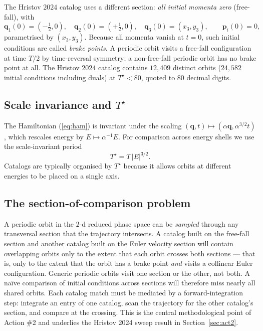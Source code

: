 \documentclass[11pt]{article}
\newcommand{\qvec}{\mathbf{q}}
\newcommand{\pvec}{\mathbf{p}}
\newcommand{\Tstar}{T^{\star}}
\begin{document}
The Hristov $2024$ catalog \citep{Hristov2024Catalog} uses a different
section: \emph{all initial momenta zero} (free-fall), with
\begin{equation}
  \qvec_1(0) = (-\tfrac12, 0),\quad
  \qvec_2(0) = (+\tfrac12, 0),\quad
  \qvec_3(0) = (x_3, y_3),\qquad
  \pvec_i(0) = 0,
\end{equation}
parametrised by $(x_3, y_3)$. Because all momenta vanish at $t=0$, such
initial conditions are called \emph{brake points}. A periodic orbit
visits a free-fall configuration at time $T/2$ by time-reversal
symmetry; a non-free-fall periodic orbit has no brake point at all.
The Hristov $2024$ catalog contains $12{,}409$ distinct orbits
($24{,}582$ initial conditions including duals) at $T^{\star}<80$,
quoted to $80$ decimal digits.

\subsection{Scale invariance and $T^{\star}$}

The Hamiltonian (\ref{eq:ham}) is invariant under the scaling
$(\qvec, t) \mapsto (\alpha \qvec, \alpha^{3/2} t)$, which rescales
energy by $E \mapsto \alpha^{-1} E$. For comparison across energy
shells we use the scale-invariant period
\begin{equation}
  \Tstar = T \, |E|^{3/2}.
  \label{eq:tstar}
\end{equation}
Catalogs are typically organised by $\Tstar$ because it allows
orbits at different energies to be placed on a single axis.

\subsection{The section-of-comparison problem}

A periodic orbit in the $2$-d reduced phase space can be
\emph{sampled} through any transversal section that the trajectory
intersects. A catalog built on the free-fall section and another
catalog built on the Euler velocity section will contain overlapping
orbits only to the extent that each orbit crosses both sections ---
that is, only to the extent that the orbit has a brake point
\emph{and} visits a collinear Euler configuration. Generic periodic
orbits visit one section or the other, not both. A na\"{i}ve
comparison of initial conditions across sections will therefore miss
nearly all shared orbits. Each catalog match must be mediated by a
forward-integration step: integrate an entry of one catalog, scan the
trajectory for the other catalog's section, and compare at the
crossing. This is the central methodological point of Action \#2 and
underlies the Hristov 2024 sweep result in Section~\ref{sec:act2}.
\end{document}
